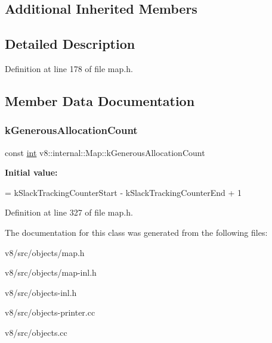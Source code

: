 \subsection*{Additional Inherited Members}


\subsection{Detailed Description}


Definition at line 178 of file map.\+h.



\subsection{Member Data Documentation}
\mbox{\label{classv8_1_1internal_1_1Map_aa0f778fa0a1188086b543f33effd55bf}} 
\subsubsection{\texorpdfstring{k\+Generous\+Allocation\+Count}{kGenerousAllocationCount}}
{\footnotesize\ttfamily const \mbox{\hyperlink{classint}{int}} v8\+::internal\+::\+Map\+::k\+Generous\+Allocation\+Count\hspace{0.3cm}{\ttfamily [static]}}

{\bfseries Initial value\+:}
\begin{DoxyCode}
=
      kSlackTrackingCounterStart - kSlackTrackingCounterEnd + 1
\end{DoxyCode}


Definition at line 327 of file map.\+h.



The documentation for this class was generated from the following files\+:\begin{DoxyCompactItemize}
\item 
v8/src/objects/map.\+h\item 
v8/src/objects/map-\/inl.\+h\item 
v8/src/objects-\/inl.\+h\item 
v8/src/objects-\/printer.\+cc\item 
v8/src/objects.\+cc\end{DoxyCompactItemize}
